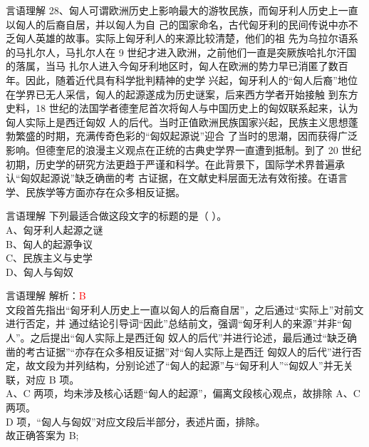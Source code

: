 \documentclass[aspectratio=169]{beamer}
\begin{document}
\begin{frame}[t]{言语理解}
28、匈人可谓欧洲历史上影响最大的游牧民族，而匈牙利人历史上一直以匈人的后裔自居，并以匈人为自
己的国家命名，古代匈牙利的民间传说中亦不乏匈人英雄的故事。实际上匈牙利人的来源比较清楚，他们的祖
先为乌拉尔语系的马扎尔人，马扎尔人在 9 世纪才进入欧洲，之前他们一直是突厥族哈扎尔汗国的落属，当马
扎尔人进入今匈牙利地区时，匈人在欧洲的势力早已消匿了数百年。因此，随着近代具有科学批判精神的史学
兴起，匈牙利人的“匈人后裔”地位在学界已无人采信，匈人的起源遂成为历史谜案，后来西方学者开始接触
到东方史料，18 世纪的法国学者德奎尼首次将匈人与中国历史上的匈奴联系起来，认为匈人实际上是西迁匈奴
人的后代。当时正值欧洲民族国家兴起，民族主义思想蓬勃繁盛的时期，充满传奇色彩的“匈奴起源说”迎合
了当时的思潮，因而获得广泛影响。但德奎尼的浪漫主义观点在正统的古典史学界一直遭到抵制。到了 20 世纪
初期，历史学的研究方法更趋于严谨和科学。在此背景下，国际学术界普遍承认“匈奴起源说”缺乏确凿的考
古证据，在文献史料层面无法有效衔接。在语言学、民族学等方面亦存在众多相反证据。\\
\end{frame}

\begin{frame}[t]{言语理解}
下列最适合做这段文字的标题的是（ ）。\\
A、匈牙利人起源之谜\\
B、匈人的起源争议\\
C、民族主义与史学\\
D、匈人与匈奴\\

\end{frame}


\begin{frame}[t]{言语理解}
    解析：\textcolor{red}{B}\\
    文段首先指出“匈牙利人历史上一直以匈人的后裔自居”，之后通过“实际上”对前文进行否定，并
通过结论引导词“因此”总结前文，强调“匈牙利人的来源”并非“匈人”。之后提出“匈人实际上是西迁匈
奴人的后代”并进行论述，最后通过“缺乏确凿的考古证据”“亦存在众多相反证据”对“匈人实际上是西迁
匈奴人的后代”进行否定，故文段为并列结构，分别论述了“匈人的起源”与“匈牙利人”“匈奴人”并无关
联，对应 B 项。\\
A、C 两项，均未涉及核心话题“匈人的起源”，偏离文段核心观点，故排除 A、C 两项。\\
D 项，“匈人与匈奴”对应文段后半部分，表述片面，排除。\\
故正确答案为 B;
\end{frame}
\end{document}
